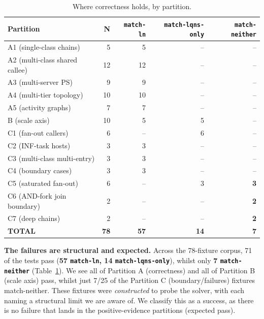 \begin{table}[h]
\centering
\small
\begin{tabular}{|l|r|r|r|r|}
\hline
Partition & N & \texttt{match-ln} & \texttt{match-lqns-only} & \texttt{match-neither} \\
\hline
A1 (single-class chains) & 5 & 5 & -- & -- \\ \hline
A2 (multi-class shared callee) & 12 & 12 & -- & -- \\ \hline
A3 (multi-server PS) & 9 & 9 & -- & -- \\ \hline
A4 (multi-tier topology) & 10 & 10 & -- & -- \\ \hline
A5 (activity graphs) & 7 & 7 & -- & -- \\ \hline
B (scale axis) & 10 & 5 & 5 & -- \\ \hline
C1 (fan-out callers) & 6 & -- & 6 & -- \\ \hline
C2 (INF-task hosts) & 3 & 3 & -- & -- \\ \hline
C3 (multi-class \texttimes{} multi-entry) & 3 & 3 & -- & -- \\ \hline
C4 (boundary cases) & 3 & 3 & -- & -- \\ \hline
C5 (saturated fan-out) & 6 & -- & 3 & \textbf{3} \\ \hline
C6 (AND-fork join boundary) & 2 & -- & -- & \textbf{2} \\ \hline
C7 (deep chains) & 2 & -- & -- & \textbf{2} \\ \hline
\textbf{TOTAL} & \textbf{78} & \textbf{57} & \textbf{14} & \textbf{7} \\
\hline
\end{tabular}
\caption{Where correctness holds, by partition.}
\label{tab:eval-correctness-map}
\end{table}

\textbf{The failures are structural and expected.} Across the 78-fixture corpus, 71 of the tests pass (\textbf{57 \texttt{match-ln}, 14 \texttt{match-lqns-only}}), whilst only \textbf{7 \texttt{match-neither}} (Table~\ref{tab:eval-correctness-map}). We see all of Partition A (correctness) and all of Partition B (scale axis) pass, whilst just 7/25 of the Partition C (boundary/failures) fixtures {match-neither}. These fixtures were \emph{constructed} to probe the solver, with each naming a structural limit we are aware of. We classify this as a success, as there is no failure that lands in the positive-evidence partitions (expected pass).

